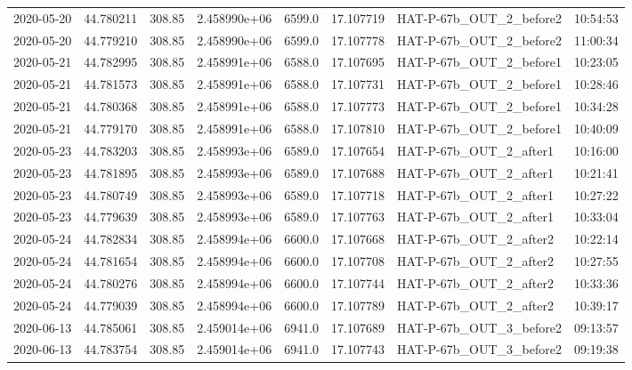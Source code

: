 \documentclass[modern]{aastex631}
\begin{document}
\begin{tabular}{lrrrlrll}
    2020-05-20 & 44.780211   & 308.85        & 2.458990e+06 & 6599.0 & 17.107719 & HAT-P-67b\_OUT\_2\_before2 & 10:54:53 \\
    2020-05-20 & 44.779210   & 308.85        & 2.458990e+06 & 6599.0 & 17.107778 & HAT-P-67b\_OUT\_2\_before2 & 11:00:34 \\
    2020-05-21 & 44.782995   & 308.85        & 2.458991e+06 & 6588.0 & 17.107695 & HAT-P-67b\_OUT\_2\_before1 & 10:23:05 \\
    2020-05-21 & 44.781573   & 308.85        & 2.458991e+06 & 6588.0 & 17.107731 & HAT-P-67b\_OUT\_2\_before1 & 10:28:46 \\
    2020-05-21 & 44.780368   & 308.85        & 2.458991e+06 & 6588.0 & 17.107773 & HAT-P-67b\_OUT\_2\_before1 & 10:34:28 \\
    2020-05-21 & 44.779170   & 308.85        & 2.458991e+06 & 6588.0 & 17.107810 & HAT-P-67b\_OUT\_2\_before1 & 10:40:09 \\
    2020-05-23 & 44.783203   & 308.85        & 2.458993e+06 & 6589.0 & 17.107654 & HAT-P-67b\_OUT\_2\_after1  & 10:16:00 \\
    2020-05-23 & 44.781895   & 308.85        & 2.458993e+06 & 6589.0 & 17.107688 & HAT-P-67b\_OUT\_2\_after1  & 10:21:41 \\
    2020-05-23 & 44.780749   & 308.85        & 2.458993e+06 & 6589.0 & 17.107718 & HAT-P-67b\_OUT\_2\_after1  & 10:27:22 \\
    2020-05-23 & 44.779639   & 308.85        & 2.458993e+06 & 6589.0 & 17.107763 & HAT-P-67b\_OUT\_2\_after1  & 10:33:04 \\
    2020-05-24 & 44.782834   & 308.85        & 2.458994e+06 & 6600.0 & 17.107668 & HAT-P-67b\_OUT\_2\_after2  & 10:22:14 \\
    2020-05-24 & 44.781654   & 308.85        & 2.458994e+06 & 6600.0 & 17.107708 & HAT-P-67b\_OUT\_2\_after2  & 10:27:55 \\
    2020-05-24 & 44.780276   & 308.85        & 2.458994e+06 & 6600.0 & 17.107744 & HAT-P-67b\_OUT\_2\_after2  & 10:33:36 \\
    2020-05-24 & 44.779039   & 308.85        & 2.458994e+06 & 6600.0 & 17.107789 & HAT-P-67b\_OUT\_2\_after2  & 10:39:17 \\
    2020-06-13 & 44.785061   & 308.85        & 2.459014e+06 & 6941.0 & 17.107689 & HAT-P-67b\_OUT\_3\_before2 & 09:13:57 \\
    2020-06-13 & 44.783754   & 308.85        & 2.459014e+06 & 6941.0 & 17.107743 & HAT-P-67b\_OUT\_3\_before2 & 09:19:38 \\

\end{tabular}
\end{document}
